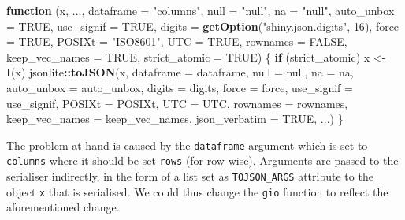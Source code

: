\documentclass[
]{krantz}
\makeatletter
\newenvironment{Shaded}{\begin{snugshade}}{\end{snugshade}}
\newcommand{\ControlFlowTok}[1]{\textcolor[rgb]{0.27,0.27,0.27}{\textbf{#1}}}
\newcommand{\DataTypeTok}[1]{\textcolor[rgb]{0.27,0.27,0.27}{#1}}
\newcommand{\DecValTok}[1]{\textcolor[rgb]{0.06,0.06,0.06}{#1}}
\newcommand{\KeywordTok}[1]{\textcolor[rgb]{0.27,0.27,0.27}{\textbf{#1}}}
\newcommand{\NormalTok}[1]{#1}
\newcommand{\OperatorTok}[1]{\textcolor[rgb]{0.43,0.43,0.43}{\textbf{#1}}}
\newcommand{\OtherTok}[1]{\textcolor[rgb]{0.37,0.37,0.37}{#1}}
\newcommand{\StringTok}[1]{\textcolor[rgb]{0.5,0.5,0.5}{#1}}
\newenvironment{kframe}{%
\medskip{}
\setlength{\fboxsep}{.8em}
 \def\at@end@of@kframe{}%
 \ifinner\ifhmode%
  \def\at@end@of@kframe{\end{minipage}}%
  \begin{minipage}{\columnwidth}%
 \fi\fi%
 \def\FrameCommand##1{\hskip\@totalleftmargin \hskip-\fboxsep
 \colorbox{shadecolor}{##1}\hskip-\fboxsep
     \hskip-\linewidth \hskip-\@totalleftmargin \hskip\columnwidth}%
 \MakeFramed {\advance\hsize-\width
   \@totalleftmargin\z@ \linewidth\hsize
   \@setminipage}}%
 {\par\unskip\endMakeFramed%
 \at@end@of@kframe}
\renewenvironment{Shaded}{\begin{kframe}}{\end{kframe}}
\makeatother
\begin{document}
\begin{Shaded}
\begin{Highlighting}[]
\ControlFlowTok{function}\NormalTok{ (x, ..., }\DataTypeTok{dataframe =} \StringTok{"columns"}\NormalTok{, }\DataTypeTok{null =} \StringTok{"null"}\NormalTok{, }
\DataTypeTok{na =} \StringTok{"null"}\NormalTok{, }\DataTypeTok{auto\_unbox =} \OtherTok{TRUE}\NormalTok{, }\DataTypeTok{use\_signif =} \OtherTok{TRUE}\NormalTok{, }
  \DataTypeTok{digits =} \KeywordTok{getOption}\NormalTok{(}\StringTok{"shiny.json.digits"}\NormalTok{, }\DecValTok{16}\NormalTok{), }\DataTypeTok{force =} \OtherTok{TRUE}\NormalTok{,}
  \DataTypeTok{POSIXt =} \StringTok{"ISO8601"}\NormalTok{, }\DataTypeTok{UTC =} \OtherTok{TRUE}\NormalTok{, }\DataTypeTok{rownames =} \OtherTok{FALSE}\NormalTok{, }
  \DataTypeTok{keep\_vec\_names =} \OtherTok{TRUE}\NormalTok{, }\DataTypeTok{strict\_atomic =} \OtherTok{TRUE}\NormalTok{) }
\NormalTok{\{}
  \ControlFlowTok{if}\NormalTok{ (strict\_atomic) }
\NormalTok{      x <{-}}\StringTok{ }\KeywordTok{I}\NormalTok{(x)}
\NormalTok{  jsonlite}\OperatorTok{::}\KeywordTok{toJSON}\NormalTok{(x, }\DataTypeTok{dataframe =}\NormalTok{ dataframe, }\DataTypeTok{null =}\NormalTok{ null, }\DataTypeTok{na =}\NormalTok{ na, }
    \DataTypeTok{auto\_unbox =}\NormalTok{ auto\_unbox, }\DataTypeTok{digits =}\NormalTok{ digits, }\DataTypeTok{force =}\NormalTok{ force, }
    \DataTypeTok{use\_signif =}\NormalTok{ use\_signif, }\DataTypeTok{POSIXt =}\NormalTok{ POSIXt, }\DataTypeTok{UTC =}\NormalTok{ UTC, }
    \DataTypeTok{rownames =}\NormalTok{ rownames, }\DataTypeTok{keep\_vec\_names =}\NormalTok{ keep\_vec\_names, }
    \DataTypeTok{json\_verbatim =} \OtherTok{TRUE}\NormalTok{, ...)}
\NormalTok{\}}
\end{Highlighting}
\end{Shaded}

The problem at hand is caused by the \texttt{dataframe} argument which is set to \texttt{columns} where it should be set \texttt{rows} (for row-wise). Arguments are passed to the serialiser indirectly, in the form of a list set as \texttt{TOJSON\_ARGS} attribute to the object \texttt{x} that is serialised. We could thus change the \texttt{gio} function to reflect the aforementioned change.
\end{document}

